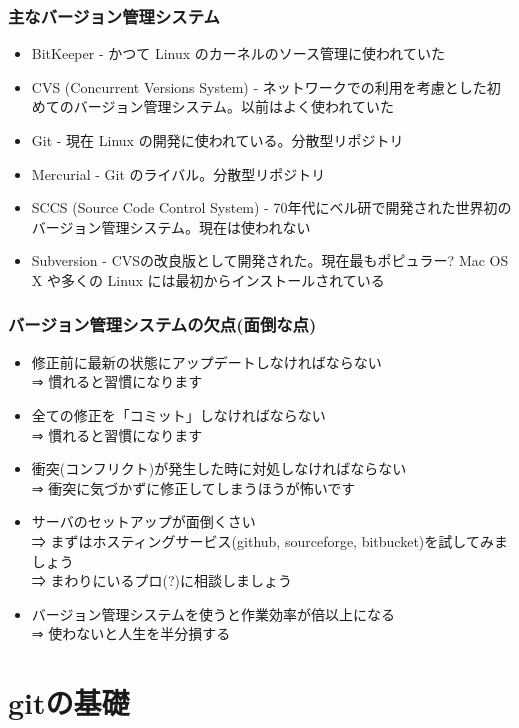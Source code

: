 \begin{frame}
  \frametitle{主なバージョン管理システム}
  \begin{itemize}
  \item BitKeeper - かつて Linux のカーネルのソース管理に使われていた
  \item CVS (Concurrent Versions System) - ネットワークでの利用を考慮とした初めてのバージョン管理システム。以前はよく使われていた
  \item Git - 現在 Linux の開発に使われている。分散型リポジトリ
  \item Mercurial - Git のライバル。分散型リポジトリ
  \item SCCS (Source Code Control System) - 70年代にベル研で開発された世界初のバージョン管理システム。現在は使われない
  \item Subversion - CVSの改良版として開発された。現在最もポピュラー? Mac OS X や多くの Linux には最初からインストールされている
  \end{itemize}
\end{frame}

\begin{frame}
  \frametitle{バージョン管理システムの欠点(面倒な点)}
  \begin{itemize}
  \item 修正前に最新の状態にアップデートしなければならない \\
   ⇒ 慣れると習慣になります
  \item 全ての修正を「コミット」しなければならない \\
    ⇒ 慣れると習慣になります
  \item 衝突(コンフリクト)が発生した時に対処しなければならない \\
    ⇒ 衝突に気づかずに修正してしまうほうが怖いです
  \item サーバのセットアップが面倒くさい \\
    ⇒ まずはホスティングサービス(github, sourceforge, bitbucket)を試してみましょう \\
    ⇒ まわりにいるプロ(?)に相談しましょう \\[.5em]
  \item バージョン管理システムを使うと作業効率が倍以上になる \\
    ⇒ {\color{red} 使わないと人生を半分損する}
  \end{itemize}
\end{frame}

\section{gitの基礎}

